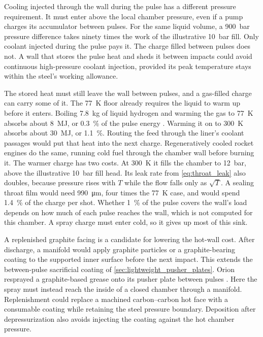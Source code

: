 \documentclass{article}
\begin{document}
Cooling injected through the wall during the pulse has a different pressure requirement. It must enter above the local chamber pressure, even if a pump charges its accumulator between pulses. For the same liquid volume, a \SI{900}{\bar} pressure difference takes ninety times the work of the illustrative \SI{10}{\bar} fill. Only coolant injected during the pulse pays it. The charge filled between pulses does not. A wall that stores the pulse heat and sheds it between impacts could avoid continuous high-pressure coolant injection, provided its peak temperature stays within the steel's working allowance.

The stored heat must still leave the wall between pulses, and a gas-filled charge can carry some of it. The \SI{77}{\kelvin} floor already requires the liquid to warm up before it enters. Boiling \SI{7.8}{\kilogram} of liquid hydrogen and warming the gas to \SI{77}{\kelvin} absorbs about \SI{8}{\mega\joule}, or \SI{0.3}{\percent} of the pulse energy \cite{nist_webbook_hydrogen}. Warming it on to \SI{300}{\kelvin} absorbs about \SI{30}{\mega\joule}, or \SI{1.1}{\percent}. Routing the feed through the liner's coolant passages would put that heat into the next charge. Regeneratively cooled rocket engines do the same, running cold fuel through the chamber wall before burning it. The warmer charge has two costs. At \SI{300}{\kelvin} it fills the chamber to \SI{12}{\bar}, above the illustrative \SI{10}{\bar} fill head. Its leak rate from \autoref{eq:throat_leak} also doubles, because pressure rises with $T$ while the flow falls only as $\sqrt{T}$. A sealing throat film would need \SI{990}{\micro\meter}, four times the \SI{77}{\kelvin} case, and would spend \SI{1.4}{\percent} of the charge per shot. Whether \SI{1}{\percent} of the pulse covers the wall's load depends on how much of each pulse reaches the wall, which is not computed for this chamber. A spray charge must enter cold, so it gives up most of this sink.

A replenished graphite facing is a candidate for lowering the hot-wall cost. After discharge, a manifold would apply graphite particles or a graphite-bearing coating to the supported inner surface before the next impact. This extends the between-pulse sacrificial coating of \autoref{sec:lightweight_pusher_plates}. Orion resprayed a graphite-based grease onto its pusher plate between pulses \cite{projorion,ga5009_vol3}. Here the spray must instead reach the inside of a closed chamber through a manifold. Replenishment could replace a machined carbon--carbon hot face with a consumable coating while retaining the steel pressure boundary. Deposition after depressurization also avoids injecting the coating against the hot chamber pressure.
\end{document}
